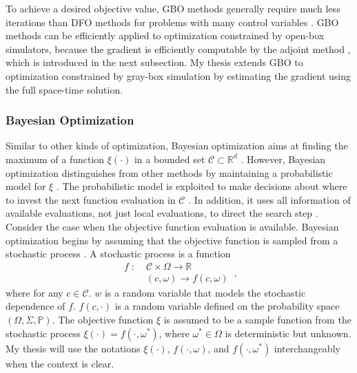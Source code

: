 \indent To achieve a desired objective value, 
GBO methods generally require much less iterations than DFO methods for problems with many 
control variables \cite{opt via sim review, nonlinear program}. GBO methods can be 
efficiently applied to 
optimization constrained by open-box simulators, because the gradient is efficiently computable by
the adjoint method \cite{adjoint, opt via sim review}, which is introduced in the next subsection.
My thesis extends GBO to optimization constrained by gray-box simulation by estimating 
the gradient using the full space-time solution.


\subsubsection{Bayesian Optimization}
\label{section: bayes opt}
Similar to other kinds of optimization, Bayesian optimization aims at finding the maximum
of a function $\xi(\cdot)$ in a bounded set $\mathcal{C}\subset \mathbb{R}^d$ 
\cite{practical Bayesian, review EI, jones1998}. However,
Bayesian optimization distinguishes from other methods by maintaining a probabilistic
model for $\xi$ \cite{practical Bayesian, review EI, jones1998}. 
The probabilistic model is exploited to 
make decisions about where to invest the next function evaluation in $\mathcal{C}$ 
\cite{practical Bayesian, review EI, jones1998}.
In addition, it uses all information of available evaluations, not just local evaluations,
to direct the search step 
\cite{practical Bayesian, review EI, jones1998}.\\

Consider the case when the objective function evaluation is available.
Bayesian optimization begins by assuming that the objective function is sampled
from a stochastic process \cite{practical Bayesian, review EI, jones1998}. 
A stochastic process is a function
\begin{equation}\begin{split}
    f \; :\; & \mathcal{C} \times \Omega \rightarrow \mathbb{R}\\
         & (c, \omega) \rightarrow f(c,\omega)
\end{split}\,,\label{stochastic process}
\end{equation}
where for any $c\in \mathcal{C}$. $w$ is a random variable that models the stochastic dependence 
of $f$. $f(c, \cdot)$ is a random variable defined 
on the probability space $(\Omega, \Sigma, \mathbb{P})$. 
The objective function $\xi$ is assumed to be a sample function from the stochastic process
$\xi(\cdot) = f(\cdot, \omega^*)$, where $\omega^* \in \Omega$ is deterministic but unknown.
My thesis will use the notations $\xi(\cdot)$, $f(\cdot, \omega)$, and $f(\cdot, \omega^*)$ 
interchangeably when the context is clear.\\

